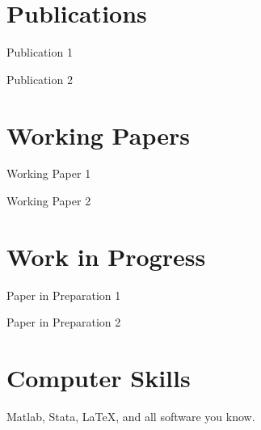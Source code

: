 \documentclass[letterpaper]{article}
\renewenvironment{itemize}{
  \begin{list}{}{
    \setlength{\leftmargin}{1em}
  }
}{
  \end{list}
}
\begin{document}
\section*{Publications}
\begin{itemize}
\item Publication 1
\item Publication 2
\end{itemize}
\section*{Working Papers}
\begin{itemize}
\item Working Paper 1
\item Working Paper 2
\end{itemize}
\section*{Work in Progress}
\begin{itemize}
\item Paper in Preparation 1
\item Paper in Preparation 2
\end{itemize}

\section*{Computer Skills}
Matlab, Stata, \LaTeX, and all software you know.

\bigskip
\begin{center}
\begin{footnotesize}
\end{footnotesize}
\end{center}
\end{document}
